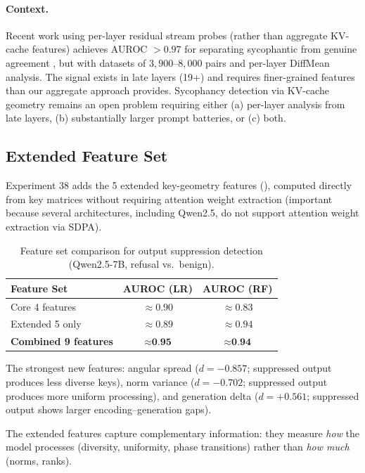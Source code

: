 \paragraph{Context.} Recent work using per-layer residual stream probes (rather than aggregate KV-cache features) achieves AUROC $> 0.97$ for separating sycophantic from genuine agreement \citep{vennemeyer2025sycophancy}, but with datasets of $3{,}900$--$8{,}000$ pairs and per-layer DiffMean analysis. The signal exists in late layers (19+) and requires finer-grained features than our aggregate approach provides. Sycophancy detection via KV-cache geometry remains an open problem requiring either (a) per-layer analysis from late layers, (b) substantially larger prompt batteries, or (c) both.

\subsection{Extended Feature Set}
\label{sec:extended}

Experiment 38 adds the 5 extended key-geometry features (), computed directly from key matrices without requiring attention weight extraction (important because several architectures, including Qwen2.5, do not support attention weight extraction via SDPA).

\begin{table}[H]
\centering
\caption{Feature set comparison for output suppression detection (Qwen2.5-7B, refusal vs.\ benign).}
\label{tab:extended}
\begin{tabular}{lcc}
\toprule
\textbf{Feature Set} & \textbf{AUROC (LR)} & \textbf{AUROC (RF)} \\
\midrule
Core 4 features & $\approx 0.90$ & $\approx 0.83$ \\
Extended 5 only & $\approx 0.89$ & $\approx 0.94$ \\
\textbf{Combined 9 features} & $\approx \textbf{0.95}$ & $\approx \textbf{0.94}$ \\
\bottomrule
\end{tabular}
\end{table}

The strongest new features: angular spread ($d = -0.857$; suppressed output produces less diverse keys), norm variance ($d = -0.702$; suppressed output produces more uniform processing), and generation delta ($d = +0.561$; suppressed output shows larger encoding--generation gaps).

The extended features capture complementary information: they measure \emph{how} the model processes (diversity, uniformity, phase transitions) rather than \emph{how much} (norms, ranks).

